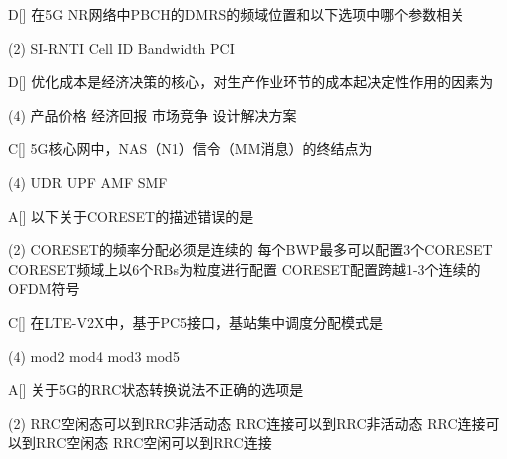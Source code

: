 \begin{choice}{D}[]
    在5G NR网络中PBCH的DMRS的频域位置和以下选项中哪个参数相关
    \begin{tasks}(2)
        \task SI-RNTI
        \task Cell ID
        \task  Bandwidth
        \task PCI
    \end{tasks}
\end{choice}


\begin{choice}{D}[]
    优化成本是经济决策的核心，对生产作业环节的成本起决定性作用的因素为
    \begin{tasks}(4)
        \task 产品价格
        \task 经济回报
        \task 市场竞争
        \task 设计解决方案
    \end{tasks}
\end{choice}


\begin{choice}{C}[]
    5G核心网中，NAS（N1）信令（MM消息）的终结点为
    \begin{tasks}(4)
        \task UDR
        \task UPF
        \task AMF
        \task SMF
    \end{tasks}
\end{choice}



\begin{choice}{A}[]
    以下关于CORESET的描述错误的是
    \begin{tasks}(2)
        \task CORESET的频率分配必须是连续的
        \task 每个BWP最多可以配置3个CORESET
        \task CORESET频域上以6个RBs为粒度进行配置
        \task CORESET配置跨越1-3个连续的OFDM符号
    \end{tasks}
\end{choice}


\begin{choice}{C}[]
    在LTE-V2X中，基于PC5接口，基站集中调度分配模式是
    \begin{tasks}(4)
        \task mod2
        \task mod4
        \task mod3
        \task mod5
    \end{tasks}
\end{choice}


\begin{choice}{A}[]
    关于5G的RRC状态转换说法不正确的选项是
    \begin{tasks}(2)
        \task RRC空闲态可以到RRC非活动态
        \task RRC连接可以到RRC非活动态
        \task RRC连接可以到RRC空闲态
        \task RRC空闲可以到RRC连接
    \end{tasks}
\end{choice}



